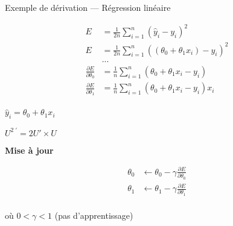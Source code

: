 \begin{frame}{Exemple de dérivation --- Régression linéaire}
  \begin{minipage}[l]{0.49\linewidth}
    \begin{align*}
      E & = \frac{1}{2n} \sum_{i=1}^n( \hat{y}_i - y_i )^2 \\
      E & = \frac{1}{2n}\sum_{i=1}^n( (\theta_0 + \theta_1 x_i) - y_i )^2 \\
      & ... \\
      \frac{\partial E}{\partial \theta_0} & = \frac{1}{n}\sum^n_{i=1}(\theta_0 + \theta_1 x_i - y_i) \\
      \frac{\partial E}{\partial \theta_1} & = \frac{1}{n}\sum^n_{i=1}(\theta_0 + \theta_1 x_i - y_i) x_i \\
    \end{align*}
  \end{minipage}\hfill
  \begin{minipage}[c]{0.49\linewidth}
    \begin{center}
      $\boxed{\hat{y}_i = \theta_0 + \theta_1 x_i}$
    \end{center}

    \begin{center}
      $\boxed{U^{2\;\prime}=2U' \times U}$
    \end{center}

    \begin{center}
      \textbf{Mise à jour}

      \begin{align*}
        \theta_0 & \leftarrow \theta_0 - \gamma\frac{\partial{E}}{\partial{\theta_0}} \\
        \theta_1 & \leftarrow \theta_1 - \gamma\frac{\partial{E}}{\partial{\theta_1}} \\
      \end{align*}

      où $0 < \gamma < 1$ (pas d'apprentissage)
    \end{center}
  \end{minipage}\hfill
\end{frame}
